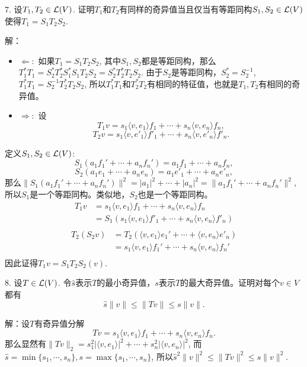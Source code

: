 \documentclass[hyperref,]{ctexart}
\begin{document}
\bigskip

\noindent{} 7. 设\(T_1,T_2\in\mathcal{L}(V)\).
证明\(T_1\)和\(T_2\)有同样的奇异值当且仅当有等距同构\(S_1,S_2\in\mathcal{L}(V)\)使得\(T_1=S_1T_2S_2\).

\smallskip

\noindent{} 解：

\begin{itemize}
\item
  \(\Leftarrow:\) 如果\(T_1=S_1T_2S_2\),
  其中\(S_1,S_2\)都是等距同构，那么\(T_1^*T_1 = S_2^*T_2^*S_1^*S_1T_2S_2 = S_2^*T_2^*T_2S_2\).
  由于\(S_2\)是等距同构，\(S_2^*=S_2^{-1}\),
  \(T_1^*T_1=S_2^{-1}T_2^*T_2S_2\),
  所以\(T_1^*T_1\)和\(T_2^*T_2\)有相同的特征值，也就是\(T_1,T_2\)有相同的奇异值。
\item
  \(\Rightarrow:\) 设
  \[T_1 v= s_1\langle v,e_1\rangle f_1+\cdots+s_n\langle v,e_n\rangle f_n,\]
  \[T_2 v= s_1\langle v,e'_1\rangle f'_1+\cdots+s_n\langle v,e'_n\rangle f'_n.\]
\end{itemize}

定义\(S_1,S_2\in\mathcal{L}(V)\):
\[S_1(a_1f_1'+\cdots+a_nf_n')=a_1f_1+\cdots+a_nf_n,\]
\[S_2(a_1e_1+\cdots+a_ne_n)=a_1e'_1+\cdots+a_ne'_n,\]
那么\(\|S_1(a_1f_1'+\cdots+a_nf_n')\|^2=|a_1|^2+\cdots+|a_n|^2=\|a_1f_1'+\cdots+a_nf_n'\|^2\),
所以\(S_1\)是一个等距同构。类似地，\(S_2\)也是一个等距同构。 \[
\begin{aligned}
T_1v &= s_1\langle v,e_1\rangle f_1+\cdots+s_n\langle v,e_n\rangle f_n\\
&=S_1(s_1\langle v,e_1\rangle f'_1+\cdots+s_n\langle v,e_n\rangle f'_n)\\
\end{aligned}\] \[
\begin{aligned}
T_2(S_2v)&=T_2(\langle v,e_1\rangle e_1'+\cdots+\langle v,e_n\rangle e'_n)\\
&=s_1\langle v,e_1\rangle f_1'+\cdots+s_n\langle v,e_n\rangle f_n'\\
\end{aligned}
\] 因此证得\(T_1v=S_1T_2S_2(v)\).

\bigskip

\noindent{} 8. 设\(T\in\mathcal{L}(V)\).
令\(\hat{s}\)表示\(T\)的最小奇异值，\(s\)表示\(T\)的最大奇异值。证明对每个\(v\in V\)都有
\[\hat{s}\|v\|\le\|Tv\|\le s\|v\|.\]

\smallskip

\noindent{} 解：设\(T\)有奇异值分解
\[Tv = s_1\langle v,e_1\rangle f_1+\cdots+s_n\langle v,e_n\rangle f_n.\]
那么显然有\(\|Tv\|_2 = s_1^2|\langle v,e_1\rangle|^2+\cdots +s_n^2|\langle v,e_n\rangle|^2\),
而\(\hat{s}=\min\{s_1,\cdots,s_n\},s=\max\{s_1,\cdots,s_n\}\),
所以\(\hat{s}^2\|v\|^2\le\|Tv\|^2\le s\|v\|^2\).
\end{document}
